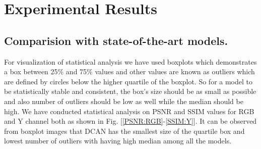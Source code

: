 \documentclass[conference]{IEEEtran}
\begin{document}
\section{Experimental Results}
\subsection{Comparision with state-of-the-art models.}

For visualization of statistical analysis we have used boxplots which demonstrates a box between 25\% and 75\% values and other values are known as outliers which are defined by circles below the higher quartile of the boxplot. So for a model to be statistically stable and consistent, the box's size should be as small as possible and also number of outliers should be low as well while the median should be high. We have conducted statistical analysis on PSNR and SSIM values for RGB and Y channel both as shown in Fig. [\ref{PSNR:RGB}-\ref{SSIM:Y}]. It can be observed from boxplot images that DCAN has the smallest size of the quartile box and lowest number of outliers with having high median among all the models. 
\end{document}
